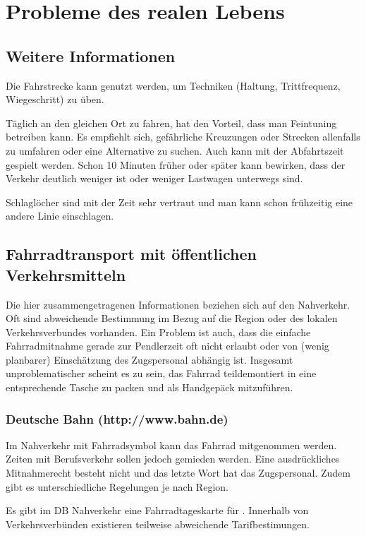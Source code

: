 \chapter{Probleme des realen Lebens}

\section{Weitere Informationen}

Die Fahrstrecke kann genutzt werden, um Techniken (Haltung, Trittfrequenz, Wiegeschritt) zu üben.

Täglich an den gleichen Ort zu fahren, hat den Vorteil, dass man Feintuning betreiben kann.
Es empfiehlt sich, gefährliche Kreuzungen oder Strecken allenfalls zu umfahren oder eine Alternative zu suchen.
Auch kann mit der Abfahrtszeit gespielt werden. Schon 10 Minuten früher oder später kann bewirken, dass der Verkehr deutlich weniger ist oder weniger Lastwagen unterwegs sind.

Schlaglöcher sind mit der Zeit sehr vertraut und man kann schon frühzeitig eine andere Linie einschlagen.


\section{Fahrradtransport mit öffentlichen Verkehrsmitteln}

Die hier zusammengetragenen Informationen beziehen sich auf den Nahverkehr.
Oft sind abweichende Bestimmung im Bezug auf die Region oder des lokalen Verkehrsverbundes vorhanden.
Ein Problem ist auch, dass die einfache Fahrradmitnahme gerade zur Pendlerzeit oft nicht erlaubt oder
von (wenig planbarer) Einschätzung des Zugspersonal abhängig ist.
Insgesamt unproblematischer scheint es zu sein, das Fahrrad teildemontiert in eine entsprechende Tasche zu packen und als Handgepäck mitzuführen.

\subsection{Deutsche Bahn (http://www.bahn.de)}
Im Nahverkehr mit Fahrradsymbol kann das Fahrrad mitgenommen werden.
Zeiten mit Berufsverkehr sollen jedoch gemieden werden.
Eine ausdrückliches Mitnahmerecht besteht nicht und das letzte Wort hat das Zugspersonal. Zudem gibt es unterschiedliche Regelungen je nach Region.

Es gibt im DB Nahverkehr eine Fahrradtageskarte für . Innerhalb von Verkehrsverbünden existieren teilweise abweichende Tarifbestimungen.

